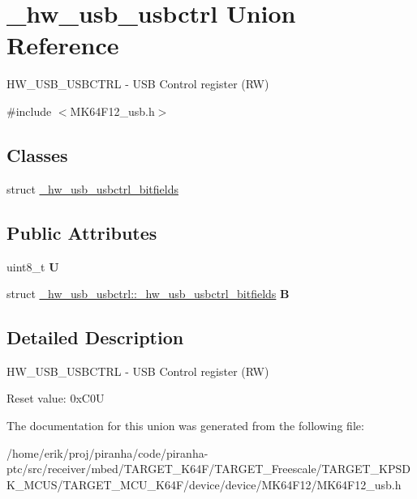 \hypertarget{union__hw__usb__usbctrl}{}\section{\+\_\+hw\+\_\+usb\+\_\+usbctrl Union Reference}
\label{union__hw__usb__usbctrl}


H\+W\+\_\+\+U\+S\+B\+\_\+\+U\+S\+B\+C\+T\+RL -\/ U\+SB Control register (RW)  




{\ttfamily \#include $<$M\+K64\+F12\+\_\+usb.\+h$>$}

\subsection*{Classes}
\begin{DoxyCompactItemize}
\item 
struct \hyperlink{struct__hw__usb__usbctrl_1_1__hw__usb__usbctrl__bitfields}{\+\_\+hw\+\_\+usb\+\_\+usbctrl\+\_\+bitfields}
\end{DoxyCompactItemize}
\subsection*{Public Attributes}
\begin{DoxyCompactItemize}
\item 
uint8\+\_\+t {\bfseries U}\hypertarget{union__hw__usb__usbctrl_a85a7cad0d696e85c756ac3af628cf6a9}{}\label{union__hw__usb__usbctrl_a85a7cad0d696e85c756ac3af628cf6a9}

\item 
struct \hyperlink{struct__hw__usb__usbctrl_1_1__hw__usb__usbctrl__bitfields}{\+\_\+hw\+\_\+usb\+\_\+usbctrl\+::\+\_\+hw\+\_\+usb\+\_\+usbctrl\+\_\+bitfields} {\bfseries B}\hypertarget{union__hw__usb__usbctrl_aa516931520ba7cc0eb9487bfe466a4af}{}\label{union__hw__usb__usbctrl_aa516931520ba7cc0eb9487bfe466a4af}

\end{DoxyCompactItemize}


\subsection{Detailed Description}
H\+W\+\_\+\+U\+S\+B\+\_\+\+U\+S\+B\+C\+T\+RL -\/ U\+SB Control register (RW) 

Reset value\+: 0x\+C0U 

The documentation for this union was generated from the following file\+:\begin{DoxyCompactItemize}
\item 
/home/erik/proj/piranha/code/piranha-\/ptc/src/receiver/mbed/\+T\+A\+R\+G\+E\+T\+\_\+\+K64\+F/\+T\+A\+R\+G\+E\+T\+\_\+\+Freescale/\+T\+A\+R\+G\+E\+T\+\_\+\+K\+P\+S\+D\+K\+\_\+\+M\+C\+U\+S/\+T\+A\+R\+G\+E\+T\+\_\+\+M\+C\+U\+\_\+\+K64\+F/device/device/\+M\+K64\+F12/M\+K64\+F12\+\_\+usb.\+h\end{DoxyCompactItemize}

